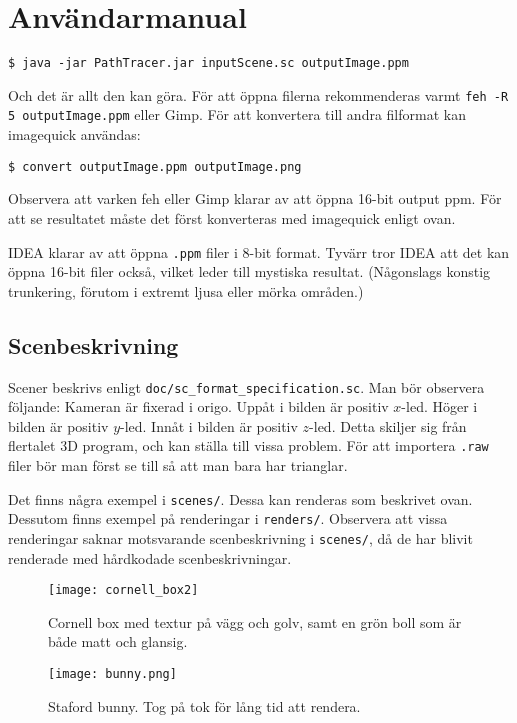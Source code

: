 \documentclass{article}
\begin{document}
\section{Användarmanual}
\begin{verbatim}
$ java -jar PathTracer.jar inputScene.sc outputImage.ppm
\end{verbatim}
Och det är allt den kan göra. För att öppna filerna rekommenderas
varmt \texttt{feh -R 5 outputImage.ppm} eller Gimp. För att konvertera
till andra filformat kan imagequick användas:
\begin{verbatim}
$ convert outputImage.ppm outputImage.png
\end{verbatim}
Observera att varken feh eller Gimp klarar av att öppna 16-bit output
ppm. För att se resultatet måste det först konverteras med imagequick
enligt ovan.

IDEA klarar av att öppna \texttt{.ppm} filer i 8-bit format. Tyvärr
tror IDEA att det kan öppna 16-bit filer också, vilket leder till
mystiska resultat. (Någonslags konstig trunkering, förutom i extremt
ljusa eller mörka områden.)

\subsection{Scenbeskrivning}
Scener beskrivs enligt \texttt{doc/sc\_format\_specification.sc}. Man
bör observera följande: Kameran är fixerad i origo. Uppåt i bilden är
positiv $x$-led. Höger i bilden är positiv $y$-led. Innåt i bilden är
positiv $z$-led. Detta skiljer sig från flertalet 3D program, och kan
ställa till vissa problem. För att importera \texttt{.raw} filer bör
man först se till så att man bara har trianglar.

Det finns några exempel i \texttt{scenes/}. Dessa kan renderas som
beskrivet ovan. Dessutom finns exempel på renderingar i
\texttt{renders/}. Observera att vissa renderingar saknar motsvarande
scenbeskrivning i \texttt{scenes/}, då de har blivit renderade med
hårdkodade scenbeskrivningar.

\begin{figure}
  \begin{center}
  \texttt{[image: cornell\_box2]}
  \caption{Cornell box med textur på vägg och golv, samt en grön boll
    som är både matt och glansig.}
  \end{center}
\end{figure}

\begin{figure}
  \begin{center}
  \texttt{[image: bunny.png]}
  \caption{Staford bunny. Tog på tok för lång tid att rendera.}
  \end{center}
\end{figure}
\end{document}
